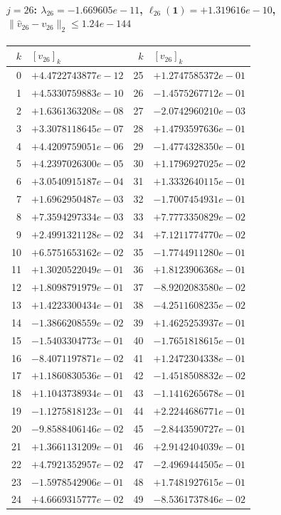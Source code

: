 \documentclass[11pt]{article}
\begin{document}
\paragraph{$j = 26$: $\lambda_{26} = -1.669605e-11$, \quad $\ell_{26}(\mathbf{1}) = +1.319616e-10$, \quad $\|\hat{v}_{26} - v_{26}\|_2 \leq 1.24e-144$}
\begin{center}
{\footnotesize
\begin{tabular}{r@{\;\;}l@{\quad}r@{\;\;}l}
\toprule
$k$ & $[v_{26}]_k$ & $k$ & $[v_{26}]_k$ \\
\midrule
0 & $+4.4722743877e-12$ & 25 & $+1.2747585372e-01$ \\
1 & $+4.5330759883e-10$ & 26 & $-1.4575267712e-01$ \\
2 & $+1.6361363208e-08$ & 27 & $-2.0742960210e-03$ \\
3 & $+3.3078118645e-07$ & 28 & $+1.4793597636e-01$ \\
4 & $+4.4209759051e-06$ & 29 & $-1.4774328350e-01$ \\
5 & $+4.2397026300e-05$ & 30 & $+1.1796927025e-02$ \\
6 & $+3.0540915187e-04$ & 31 & $+1.3332640115e-01$ \\
7 & $+1.6962950487e-03$ & 32 & $-1.7007454931e-01$ \\
8 & $+7.3594297334e-03$ & 33 & $+7.7773350829e-02$ \\
9 & $+2.4991321128e-02$ & 34 & $+7.1211774770e-02$ \\
10 & $+6.5751653162e-02$ & 35 & $-1.7744911280e-01$ \\
11 & $+1.3020522049e-01$ & 36 & $+1.8123906368e-01$ \\
12 & $+1.8098791979e-01$ & 37 & $-8.9202083580e-02$ \\
13 & $+1.4223300434e-01$ & 38 & $-4.2511608235e-02$ \\
14 & $-1.3866208559e-02$ & 39 & $+1.4625253937e-01$ \\
15 & $-1.5403304773e-01$ & 40 & $-1.7651818615e-01$ \\
16 & $-8.4071197871e-02$ & 41 & $+1.2472304338e-01$ \\
17 & $+1.1860830536e-01$ & 42 & $-1.4518508832e-02$ \\
18 & $+1.1043738934e-01$ & 43 & $-1.1416265678e-01$ \\
19 & $-1.1275818123e-01$ & 44 & $+2.2244686771e-01$ \\
20 & $-9.8588406146e-02$ & 45 & $-2.8443590727e-01$ \\
21 & $+1.3661131209e-01$ & 46 & $+2.9142404039e-01$ \\
22 & $+4.7921352957e-02$ & 47 & $-2.4969444505e-01$ \\
23 & $-1.5978542906e-01$ & 48 & $+1.7481927615e-01$ \\
24 & $+4.6669315777e-02$ & 49 & $-8.5361737846e-02$ \\
\bottomrule
\end{tabular}
}
\end{center}
\end{document}
